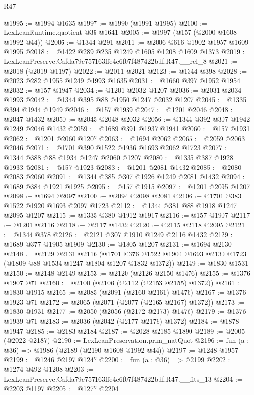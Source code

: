 \begin{lexlean}{R47}
\begin{coremodule}
@1995 := @1994 @1635
@1997 := @1990 (@1991 @1995)
@2000 := LexLeanRuntime.quotient @36 @1641
@2005 := @1997 (@157 (@2000 @1608 @1992 @44))
@2006 := @1344 @291
@2011 := @2006 @616 @1902 @1957 @1609 @1995
@2018 := @1422 @289 @235 @1249 @1605 @1208 @1609 @1373
@2019 := LexLeanPreserve.Cafda79c757163ffe4c6f07f487422bdf.R47.__rel_8
@2021 := @2018 (@2019 @1197)
@2022 := @2011 @2021
@2023 := @1344 @398
@2028 := @2023 @282 @1955 @1249 @1993 @1635
@2031 := @1660 @397 @1952 @1954
@2032 := @157 @1947
@2034 := @1201 @2032 @1207
@2036 := @2031 @2034 @1993
@2042 := @1344 @395 @88 @1950 @1247 @2032 @1207
@2045 := @1335 @394 @1944 @1949
@2046 := @157 @1939
@2047 := @1201 @2046
@2048 := @2047 @1432
@2050 := @2045 @2048 @2032
@2056 := @1344 @392 @307 @1942 @1249 @2046 @1432
@2059 := @1689 @391 @1937 @1941
@2060 := @157 @1931
@2062 := @1201 @2060 @1207
@2063 := @1694 @2062
@2065 := @2059 @2063 @2046
@2071 := @1701 @390 @1522 @1936 @1693 @2062 @1723
@2077 := @1344 @388 @88 @1934 @1247 @2060 @1207
@2080 := @1335 @387 @1928 @1933
@2081 := @157 @1923
@2083 := @1201 @2081 @1432
@2085 := @2080 @2083 @2060
@2091 := @1344 @385 @307 @1926 @1249 @2081 @1432
@2094 := @1689 @384 @1921 @1925
@2095 := @157 @1915
@2097 := @1201 @2095 @1207
@2098 := @1694 @2097
@2100 := @2094 @2098 @2081
@2106 := @1701 @383 @1522 @1920 @1693 @2097 @1723
@2112 := @1344 @381 @88 @1918 @1247 @2095 @1207
@2115 := @1335 @380 @1912 @1917
@2116 := @157 @1907
@2117 := @1201 @2116
@2118 := @2117 @1432
@2120 := @2115 @2118 @2095
@2121 := @1344 @378
@2126 := @2121 @307 @1910 @1249 @2116 @1432
@2129 := @1689 @377 @1905 @1909
@2130 := @1805 @1207
@2131 := @1694 @2130
@2148 := @2129
    @2131
    @2116
    (@1701 @376 @1522 @1904 @1693 @2130 @1723 (@1809 @88 @1534 @1247 @1804 @1207 @1832 @1372))
@2149 := @1830 @1531
@2150 := @2148 @2149
@2153 := @2120 (@2126 @2150 @1476)
@2155 := @1376 @1907 @71
@2160 := @2100 (@2106 (@2112 (@2153 @2155) @1372))
@2161 := @1830 @1915
@2165 := @2085 (@2091 (@2160 @2161) @1476)
@2167 := @1376 @1923 @71
@2172 := @2065 (@2071 (@2077 (@2165 @2167) @1372))
@2173 := @1830 @1931
@2177 := @2050 (@2056 (@2172 @2173) @1476)
@2179 := @1376 @1939 @71
@2183 := @2036 (@2042 (@2177 @2179) @1372)
@2184 := @1878 @1947
@2185 := @2183 @2184
@2187 := @2028 @2185 @1890
@2189 := @2005 (@2022 @2187)
@2190 := LexLeanPreservation.prim_natQuot
@2196 := fun (a : @36) => @1986 (@2189 (@2190 @1608 @1992 @44))
@2197 := @1248 @1957
@2199 := @1246 @2197 @1247
@2200 := fun (a : @36) => @2199
@2202 := @1274 @492 @1208
@2203 := LexLeanPreserve.Cafda79c757163ffe4c6f07f487422bdf.R47.__fits_13
@2204 := @2203 @1197
@2205 := @1277 @2204

\end{coremodule}
\end{lexlean}
